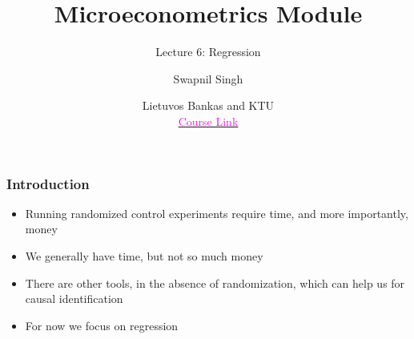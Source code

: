 \documentclass{beamer}
\title{Microeconometrics Module}
\subtitle{Lecture 6: Regression}
\author{Swapnil Singh}
\date{Lietuvos Bankas and KTU \\ \href{https://github.com/swapnil1987/econometrics-2024}{\textcolor{magenta}{Course Link}}}
\theoremstyle{plain}
\begin{document}
	
	\maketitle
	
	
	\begin{frame}
	\frametitle{Introduction}
	
	\begin{itemize}
		\item Running randomized control experiments require time, and more importantly, money
		\item We generally have time, but not so much money
		\item There are other tools, in the absence of randomization, which can help us for causal identification
		\item For now we focus on regression
	\end{itemize}
	\end{frame}
	
\end{document}
